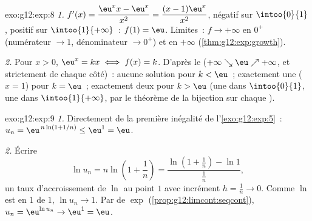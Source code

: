 \begin{solution}{exo:g12:exp:8}
\emph{1.} $f'(x) = \dfrac{\eu^x x - \eu^x}{x^2} = \dfrac{(x-1)\eu^x}{x^2}$,
négatif sur $\intoo{0}{1}$, positif sur $\intoo{1}{+\infty}$~: 
$f(1) = \eu$. Limites~: $f \to +\infty$ en $0^+$ (numérateur $\to 1$,
dénominateur $\to 0^+$) et en $+\infty$ (\cref{thm:g12:exp:growth}).

\emph{2.} Pour $x > 0$, $\eu^x = kx \iff f(x) = k$. D'après le  ($+\infty \searrow \eu \nearrow +\infty$,  et
strictement  de chaque côté)~: aucune solution pour $k < \eu$~;
exactement une ($x = 1$) pour $k = \eu$~; exactement deux pour $k > \eu$
(une dans $\intoo{0}{1}$, une dans $\intoo{1}{+\infty}$, par le théorème
de la bijection sur chaque ).
\end{solution}

\begin{solution}{exo:g12:exp:9}
\emph{1.} Directement de la première inégalité de l'\cref{exo:g12:exp:5}~:
$u_n = \eu^{\,n\ln(1+1/n)} \leq \eu^1 = \eu$.

\emph{2.} Écrire
\[
\ln u_n = n \ln\!\left(1 + \frac1n\right)
= \frac{\ln\!\left(1 + \frac1n\right) - \ln 1}{\frac1n},
\]
un taux d'accroissement de $\ln$ au point $1$ avec incrément
$h = \frac1n \to 0$. Comme $\ln$ est  en $1$ de  $1$,
$\ln u_n \to 1$. Par  de $\exp$
(\cref{prop:g12:limcont:seqcont}), $u_n = \eu^{\ln u_n} \to \eu^1 = \eu$.
\end{solution}

